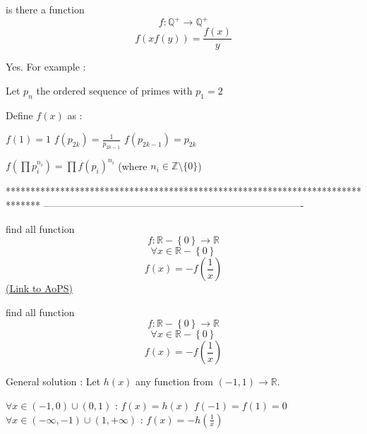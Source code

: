 \begin{solution}
	\begin{tcolorbox}is there a function 
\[f:\mathbb{Q}^{+}\rightarrow \mathbb{Q}^{+}\]
\[f(xf(y))=\frac{f(x)}{y}\]\end{tcolorbox}
Yes. For example :

Let $p_n$ the ordered sequence of primes with $p_1=2$

Define $f(x)$ as :

$f(1)=1$
$f(p_{2k})=\frac 1{p_{2k-1}}$
$f(p_{2k-1})=p_{2k}$

$f(\prod p_i^{n_i})=\prod f(p_i)^{n_i}$ (where $n_i\in\mathbb Z\setminus\{0\}$)
\end{solution}
*******************************************************************************
-------------------------------------------------------------------------------

\begin{problem}
	find all function 
\[f:\mathbb{R}-\left \{ 0 \right \}\rightarrow \mathbb{R}\]
\[\forall x\in \mathbb{R}-\left \{ 0 \right \}\]                \[f(x)=-f(\frac{1}{x})\]
	\flushright \href{https://artofproblemsolving.com/community/c6h570153}{(Link to AoPS)}
\end{problem}



\begin{solution}
	\begin{tcolorbox}find all function 
\[f:\mathbb{R}-\left \{ 0 \right \}\rightarrow \mathbb{R}\]
\[\forall x\in \mathbb{R}-\left \{ 0 \right \}\]                \[f(x)=-f(\frac{1}{x})\]\end{tcolorbox}
General solution : Let $h(x)$ any function from $(-1,1)\to\mathbb R$.

$\forall x\in(-1,0)\cup(0,1)$ : $f(x)=h(x)$
$f(-1)=f(1)=0$
$\forall x\in(-\infty,-1)\cup(1,+\infty)$ : $f(x)=-h(\frac 1x)$
\end{solution}






